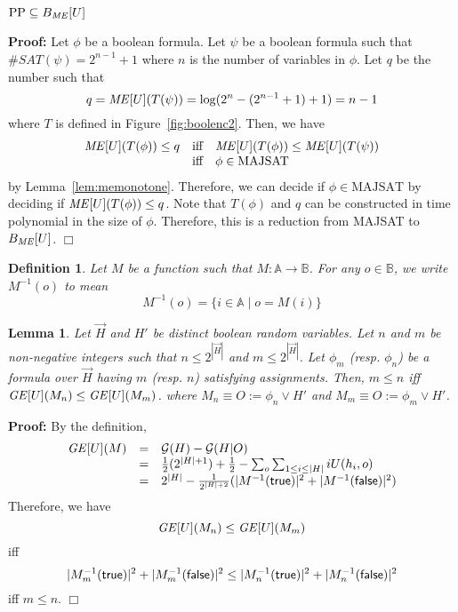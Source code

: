 \documentclass{llncs}
\newtheorem{definition}[theorem]{Definition}
\newtheorem{lemma}[theorem]{Lemma}
\newenvironment{proof}{\noindent\rm{\bf Proof:}}{\hbox{$\Box$}\vspace*{0.2\baselineskip}}
\newenvironment{reftheorem}[1]{\begin{trivlist}\item[\hskip
      \labelsep{\bf Theorem #1.}]\it}{\end{trivlist}}
\newcommand{\aset}[1]{\{{#1}\}}
\newcommand{\vect}[1]{\overrightarrow{{#1}}}
\begin{document}
\begin{reftheorem}{\ref{thm:ppme}}
$\text{PP}\subseteq B_{\it ME}[U]$
 \end{reftheorem}
\begin{proof}
  Let $\phi$ be a boolean formula.  Let $\psi$ be a boolean formula
  such that $\#SAT(\psi)=2^{n-1}+1$ where $n$ is the number of
  variables in $\phi$.  Let $q$ be the number such that
\[
q={\it ME}[U](T(\psi))
=\log(2^n-(2^{n-1}+1)+1)=n-1
\]
where $T$ is defined in Figure~\ref{fig:boolenc2}.
Then, we have
\[
\begin{array}{rcl}
  {\it ME}[U](T(\phi))\le q
& \textrm{iff}& {\it ME}[U](T(\phi)) \le {\it ME}[U](T(\psi))\\
  &\textrm{iff}& \phi\in\textrm{MAJSAT}
\end{array}
\]
by Lemma~\ref{lem:memonotone}.  Therefore, we can decide if
$\phi\in\textrm{MAJSAT}$ by deciding if ${\it ME}[U](T(\phi))\le q$.
Note that $T(\phi)$ and $q$ can be constructed in time polynomial in
the size of $\phi$.  Therefore, this is a reduction from
\textrm{MAJSAT} to $B_{\it ME}[U]$.
\end{proof}

\begin{definition}
  Let $M$ be a function such that $M:\mathbb{A}\rightarrow
  \mathbb{B}$.  For any $o\in \mathbb{B}$, we write $M^{-1}(o)$ to mean
\[
M^{-1}(o)=\aset{i\in \mathbb{A}\mid o=M(i)}
\]
\end{definition}

\begin{lemma}
\label{lem:gemonotone}
Let $\vect H$ and $H'$ be distinct boolean random variables.  Let $n$
and $m$ be non-negative integers such that $n\le 2^{|{\vect H}|}$ and
$m\le 2^{|\vect{H}|}$.  Let $\phi_m$ (resp. $\phi_n$) be a formula
over $\vect H$ having $m$ (resp. $n$) satisfying assignments. Then,
$m\le n$ iff ${\it GE}[U](M_n)\le{\it GE}[U](M_m)$.  where $M_n\equiv
O:=\phi_n\vee H'$ and $M_m\equiv O:=\phi_m\vee H'$.
\end{lemma}
\begin{proof}
By the definition, 
\[
\begin{array}{rcl}
  {\it GE}[U](M)&=&\mathcal{G}(H)-\mathcal{G}(H|O)\\
  &=&\frac{1}{2}(2^{|H|+1})+\frac{1}{2}-\sum_o\sum_{1\le i\le |H|}i U(h_i,o)\\
  &=&2^{|H|}-\frac{1}{2^{|H|+2}}(|M^{-1}({\sf true})|^2+|M^{-1}({\sf
    false})|^2)
\end{array}
\]
Therefore, we have 
\[
{\it GE}[U](M_n)\le {\it GE}[U](M_m)
\]
iff
\[
|M_m^{-1}({\sf true})|^2+|M_m^{-1}({\sf false})|^2
\le|M_n^{-1}({\sf true})|^2+|M_n^{-1}({\sf false})|^2
\]
iff $m\le n$.
\end{proof}
\end{document}
